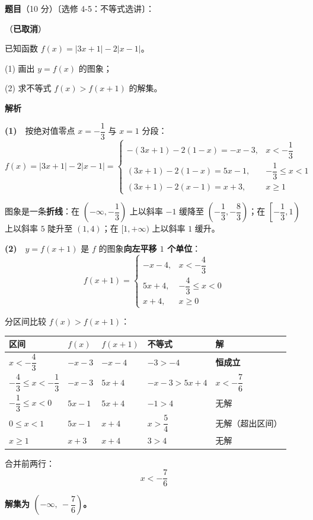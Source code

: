 \begin{answer}

\textbf{题目}（10 分）〔选修 4-5：不等式选讲〕：

（\textbf{已取消}）

已知函数 $f(x)=|3x+1|-2|x-1|$。

  (1) 画出 $y=f(x)$ 的图象；

  (2) 求不等式 $f(x)>f(x+1)$ 的解集。

\par\medskip

\textbf{解析}

\textbf{(1)}　按绝对值零点 $x=-\dfrac13$ 与 $x=1$ 分段：
\nopagebreak[4]
\[f(x)=|3x+1|-2|x-1|=\begin{cases}-(3x+1)-2(1-x)=-x-3,&x<-\dfrac13\\[2mm] (3x+1)-2(1-x)=5x-1,&-\dfrac13\le x<1\\[2mm] (3x+1)-2(x-1)=x+3,&x\ge1\end{cases}\]

图象是一条\textbf{折线}：在 $\left(-\infty,-\dfrac13\right)$ 上以斜率 $-1$ 缓降至 $\left(-\dfrac13,-\dfrac83\right)$；在 $\left[-\dfrac13,1\right)$ 上以斜率 $5$ 陡升至 $(1,4)$；在 $[1,+\infty)$ 上以斜率 $1$ 缓升。

\textbf{(2)}　$y=f(x+1)$ 是 $f$ 的图象\textbf{向左平移 $1$ 个单位}：
\nopagebreak[4]
\[f(x+1)=\begin{cases}-x-4,&x<-\dfrac43\\[2mm] 5x+4,&-\dfrac43\le x<0\\[2mm] x+4,&x\ge0\end{cases}\]

分区间比较 $f(x)>f(x+1)$：

\begin{center}
\begin{tabular}{lllll}
\toprule
区间 & $f(x)$ & $f(x+1)$ & 不等式 & 解 \\
\midrule
$x<-\dfrac43$ & $-x-3$ & $-x-4$ & $-3>-4$ & \textbf{恒成立} \\
$-\dfrac43\le x<-\dfrac13$ & $-x-3$ & $5x+4$ & $-x-3>5x+4$ & $x<-\dfrac76$ \\
$-\dfrac13\le x<0$ & $5x-1$ & $5x+4$ & $-1>4$ & 无解 \\
$0\le x<1$ & $5x-1$ & $x+4$ & $x>\dfrac54$ & 无解（超出区间） \\
$x\ge1$ & $x+3$ & $x+4$ & $3>4$ & 无解 \\
\bottomrule
\end{tabular}
\end{center}

合并前两行：
\nopagebreak[4]
\[x<-\frac76\]

\textbf{解集为 $\left(-\infty,\ -\dfrac76\right)$。}



\end{answer}